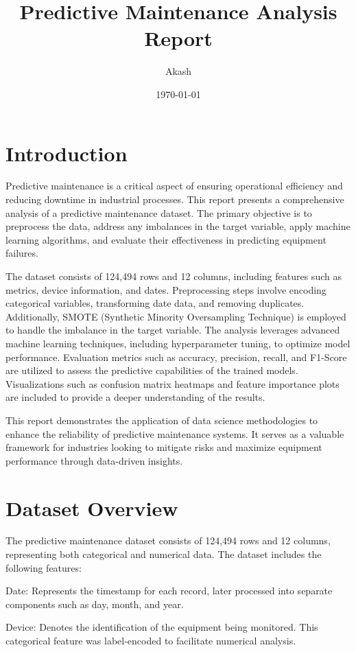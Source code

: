 \documentclass[a4paper,12pt]{article}
\title{Predictive Maintenance Analysis Report}
\author{Akash}
\date{\today}
\begin{document}
	
	\maketitle
	
	\tableofcontents
	
	\section{Introduction}
	Predictive maintenance is a critical aspect of ensuring operational efficiency and reducing downtime in industrial processes. This report presents a comprehensive analysis of a predictive maintenance dataset. The primary objective is to preprocess the data, address any imbalances in the target variable, apply machine learning algorithms, and evaluate their effectiveness in predicting equipment failures.
	
	The dataset consists of 124,494 rows and 12 columns, including features such as metrics, device information, and dates. Preprocessing steps involve encoding categorical variables, transforming date data, and removing duplicates. Additionally, SMOTE (Synthetic Minority Oversampling Technique) is employed to handle the imbalance in the target variable.
	The analysis leverages advanced machine learning techniques, including hyperparameter tuning, to optimize model performance. Evaluation metrics such as accuracy, precision, recall, and F1-Score are utilized to assess the predictive capabilities of the trained models. Visualizations such as confusion matrix heatmaps and feature importance plots are included to provide a deeper understanding of the results.
	
	This report demonstrates the application of data science methodologies to enhance the reliability of predictive maintenance systems. It serves as a valuable framework for industries looking to mitigate risks and maximize equipment performance through data-driven insights.
	
	\section{Dataset Overview}
	The predictive maintenance dataset consists of 124,494 rows and 12 columns, representing both categorical and numerical data. The dataset includes the following features:
	
	Date: Represents the timestamp for each record, later processed into separate components such as day, month, and year.
	
	Device: Denotes the identification of the equipment being monitored. This categorical feature was label-encoded to facilitate numerical analysis.
	
\end{document}
